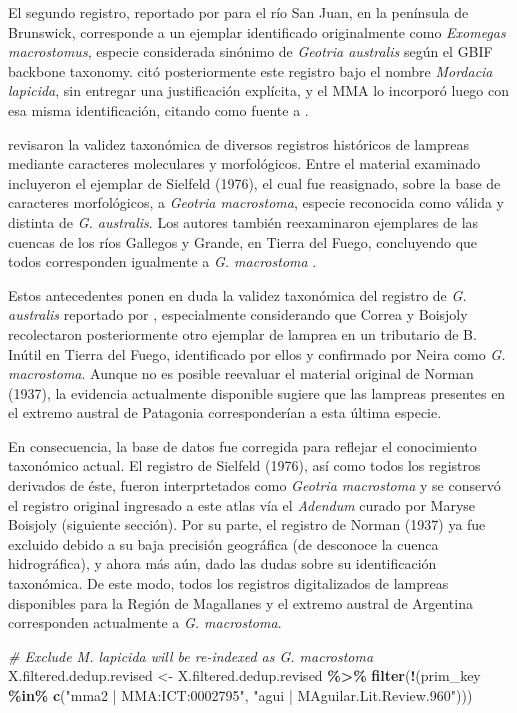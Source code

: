 \documentclass[sn-apa,pdflatex]{sn-jnl}
\newenvironment{Shaded}{\begin{snugshade}}{\end{snugshade}}
\newcommand{\CommentTok}[1]{\textcolor[rgb]{0.56,0.35,0.01}{\textit{#1}}}
\newcommand{\FunctionTok}[1]{\textcolor[rgb]{0.13,0.29,0.53}{\textbf{#1}}}
\newcommand{\NormalTok}[1]{#1}
\newcommand{\OtherTok}[1]{\textcolor[rgb]{0.56,0.35,0.01}{#1}}
\newcommand{\SpecialCharTok}[1]{\textcolor[rgb]{0.81,0.36,0.00}{\textbf{#1}}}
\newcommand{\StringTok}[1]{\textcolor[rgb]{0.31,0.60,0.02}{#1}}
\begin{document}
El segundo registro, reportado por \citet{Sieldfeld1976} para el río San
Juan, en la península de Brunswick, corresponde a un ejemplar
identificado originalmente como \emph{Exomegas macrostomus}, especie
considerada sinónimo de \emph{Geotria australis} según el GBIF backbone
taxonomy. \citet{Neira1984} citó posteriormente este registro bajo el
nombre \emph{Mordacia lapicida}, sin entregar una justificación
explícita, y el MMA lo incorporó luego con esa misma identificación,
citando como fuente a \citet{Neira1984}.

\citet{Riva-Rossi2020} revisaron la validez taxonómica de diversos
registros históricos de lampreas mediante caracteres moleculares y
morfológicos. Entre el material examinado incluyeron el ejemplar de
Sielfeld (1976), el cual fue reasignado, sobre la base de caracteres
morfológicos, a \emph{Geotria macrostoma}, especie reconocida como
válida y distinta de \emph{G. australis}. Los autores también
reexaminaron ejemplares de las cuencas de los ríos Gallegos y Grande, en
Tierra del Fuego, concluyendo que todos corresponden igualmente a
\emph{G. macrostoma} \citep{Riva-Rossi2020}.

Estos antecedentes ponen en duda la validez taxonómica del registro de
\emph{G. australis} reportado por \citet{Norman1937}, especialmente
considerando que Correa y Boisjoly recolectaron posteriormente otro
ejemplar de lamprea en un tributario de B. Inútil en Tierra del Fuego,
identificado por ellos y confirmado por Neira como \emph{G. macrostoma}.
Aunque no es posible reevaluar el material original de Norman (1937), la
evidencia actualmente disponible sugiere que las lampreas presentes en
el extremo austral de Patagonia corresponderían a esta última especie.

En consecuencia, la base de datos fue corregida para reflejar el
conocimiento taxonómico actual. El registro de Sielfeld (1976), así como
todos los registros derivados de éste, fueron interprtetados como
\emph{Geotria macrostoma} y se conservó el registro original ingresado a
este atlas vía el \emph{Adendum} curado por Maryse Boisjoly (siguiente
sección). Por su parte, el registro de Norman (1937) ya fue excluido
debido a su baja precisión geográfica (de desconoce la cuenca
hidrográfica), y ahora más aún, dado las dudas sobre su identificación
taxonómica. De este modo, todos los registros digitalizados de lampreas
disponibles para la Región de Magallanes y el extremo austral de
Argentina corresponden actualmente a \emph{G. macrostoma}.

\begin{Shaded}
\begin{Highlighting}[]
\CommentTok{\# Exclude M. lapicida will be re{-}indexed as G. macrostoma}
\NormalTok{X.filtered.dedup.revised }\OtherTok{\textless{}{-}}\NormalTok{ X.filtered.dedup.revised }\SpecialCharTok{\%\textgreater{}\%}
    \FunctionTok{filter}\NormalTok{(}\SpecialCharTok{!}\NormalTok{(prim\_key }\SpecialCharTok{\%in\%} \FunctionTok{c}\NormalTok{(}\StringTok{"mma2 | MMA:ICT:0002795"}\NormalTok{, }\StringTok{"agui | MAguilar.Lit.Review.960"}\NormalTok{)))}
\end{Highlighting}
\end{Shaded}
\end{document}
